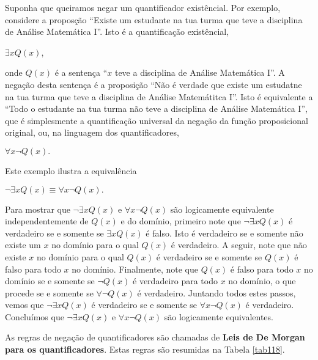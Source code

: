 Suponha que queiramos negar um quantificador existêncial. Por exemplo,
considere a proposção ``Existe um estudante na tua turma que teve a disciplina
de Análise Matemática I''. Isto é a quantificação existêncial,

\begin{center}
$\exists xQ(x)$,
\end{center}

onde $Q(x)$ é a sentença ``$x$ teve a disciplina de Análise Matemática I''. A
negação desta sentença é a proposição ``Não é verdade que existe um estudatne na
tua turma que teve a disciplina de Análise Matemátitca I''. Isto é equivalente a
``Todo o estudante na tua turma não teve a disciplina de Análise Matemática I'',
que é simplesmente a quantificação universal da negação da função proposicional
original, ou, na linguagem dos quantificadores,

\begin{center}
$\forall x\lnot Q(x).$
\end{center}

Este exemplo ilustra a equivalência

\begin{center}
\colorbox{blue!10}{$\lnot \exists xQ(x) \equiv \forall x\lnot Q(x).$}
\end{center}


Para mostrar que $\lnot\exists xQ(x)$ e $\forall x\lnot Q(x)$ são logicamente
equivalente independentemente de $Q(x)$ e do domínio, primeiro note que
$\lnot\exists xQ(x)$ é verdadeiro se e somente se $\exists xQ(x)$ é falso. Isto
é verdadeiro se e somente não existe um $x$ no domínio para o qual $Q(x)$ é
verdadeiro. A seguir, note que não existe $x$ no domínio para o qual $Q(x)$ é
verdadeiro se e somente se $Q(x)$ é falso para todo $x$ no domínio. Finalmente,
note que $Q(x)$ é falso para todo $x$ no domínio se e somente se $\lnot Q(x)$ é
verdadeiro para todo $x$ no domínio, o que procede se e somente se
$\forall\lnot Q(x)$ é verdadeiro. Juntando todos estes passos, vemos que
$\lnot\exists xQ(x)$ é verdadeiro se e somente se $\forall x\lnot Q(x)$ é
verdadeiro. Concluímos que $\lnot\exists xQ(x)$ e $\forall x\lnot Q(x)$ são
logicamente equivalentes.


As regras de negação de quantificadores são chamadas de \textbf{Leis de De
Morgan para os quantificadores}. Estas regras são resumidas na Tabela
\ref{tab118}.


